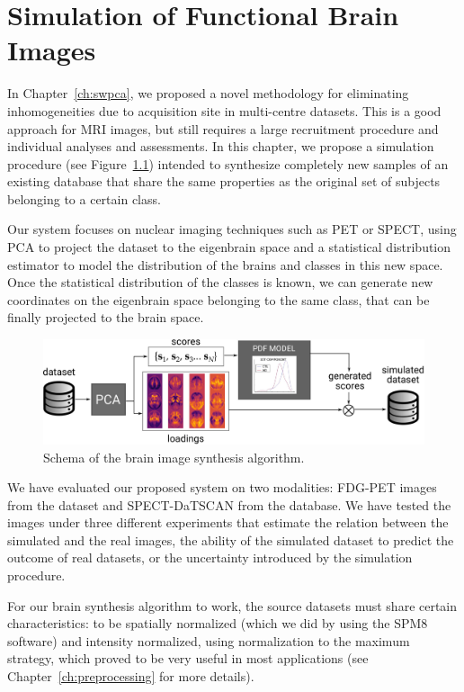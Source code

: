 \chapter{Simulation of Functional Brain Images}\label{ch:simulation}
In Chapter~\ref{ch:swpca}, we proposed a novel methodology for eliminating inhomogeneities due to acquisition site in multi-centre datasets. This is a good approach for \ac{MRI} images, but still requires a large recruitment procedure and individual analyses and assessments. In this chapter, we propose a simulation procedure (see Figure~\ref{fig:simulationSchema}) intended to synthesize completely new samples of an existing database that share the same properties as the original set of subjects belonging to a certain class.  

Our system focuses on nuclear imaging techniques such as \ac{PET} or \ac{SPECT}, using \ac{PCA} to project the dataset to the eigenbrain space and a statistical distribution estimator to model the distribution of the brains and classes in this new space. Once the statistical distribution of the classes is known, we can generate new coordinates on the eigenbrain space belonging to the same class, that can be finally projected to the brain space.
 
\begin{figure}[htp]
	\centering
	\includegraphics[width=\textwidth]{Graphics/ch8/SchemaGeneration}
	\caption{Schema of the brain image synthesis algorithm.}
	\label{fig:simulationSchema}
\end{figure} 

We have evaluated our proposed system on two modalities: FDG-\ac{PET} images from the \adnipet{} dataset and \ac{SPECT}-DaTSCAN from the \ppmidat{} database. We have tested the images under three different experiments that estimate the relation between the simulated and the real images, the ability of the simulated dataset to predict the outcome of real datasets, or the uncertainty introduced by the simulation procedure. 

For our brain synthesis algorithm to work, the source datasets must share certain characteristics: to be spatially normalized (which we did by using the SPM8 software) and intensity normalized, using normalization to the maximum strategy, which proved to be very useful in most applications \cite{Martinez-Murcia20129676,martinez2014parametrization} (see Chapter~\ref{ch:preprocessing} for more details).

